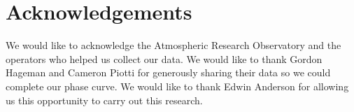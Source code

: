 \section{Acknowledgements}
  \label{sec:gordon}
  \noindent We would like to acknowledge the Atmospheric Research Observatory and the operators who 
  helped us collect our data. We would like to thank Gordon Hageman and Cameron Piotti for generously 
  sharing their data so we could complete our phase curve. We would like to thank Edwin Anderson for 
  allowing us this opportunity to carry out this research. 
